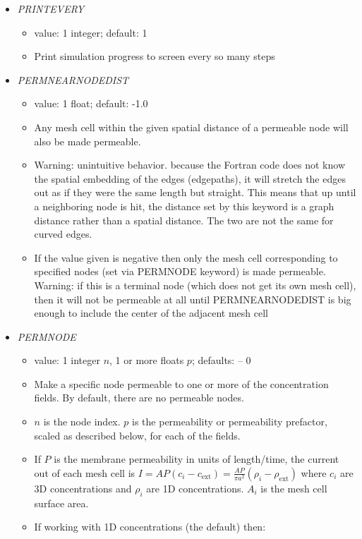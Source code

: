 \documentclass[12pt]{article}
\begin{document}
\begin{itemize}
\begin{itemize}
\end{itemize}
%
\item {\it PRINTEVERY}
\begin{itemize}
	\item  value: 1 integer; default: 1
	\item Print simulation progress to screen every so many steps
\end{itemize}
%
\item {\it PERMNEARNODEDIST}
\begin{itemize}
	\item  value: 1 float; default: -1.0
	\item Any mesh cell within the given spatial distance of a permeable node will also be made permeable.
	\item {\color{red} Warning: unintuitive behavior.} because the Fortran code does not know the spatial embedding of the edges (edgepaths), it will stretch the edges out as if they were the same length but straight. This means that up until a neighboring node is hit, the distance set by this keyword is a graph distance rather than a spatial distance. The two are not the same for curved edges.
	\item If the value given is negative then only the mesh cell corresponding to specified nodes (set via PERMNODE keyword) is made permeable. {\color{red} Warning:} if this is a terminal node (which does not get its own mesh cell), then it will not be permeable at all until PERMNEARNODEDIST is big enough to include the center of the adjacent mesh cell
\end{itemize}
%
\item {\it PERMNODE}
\begin{itemize}
	\item  value: 1 integer $n$, 1 or more floats $p$; defaults: -- 0
	\item Make a specific node permeable to one or more of the concentration fields. By default, there are no permeable nodes.	
	\item $n$ is the node index. $p$ is the permeability or permeability prefactor, scaled as described below, for each of the fields.
	\item If $P$ is the membrane permeability in units of length/time, the current out of each mesh cell is $I = AP (c_i - c_\text{ext}) = \frac{AP}{\pi a^2} (\rho_i - \rho_\text{ext})$ where $c_i$ are 3D concentrations and $\rho_i$ are 1D concentrations. $A_i$ is the mesh cell surface area.
	\item If working with 1D concentrations (the default) then:

\end{itemize}
\end{itemize}
\end{document}
